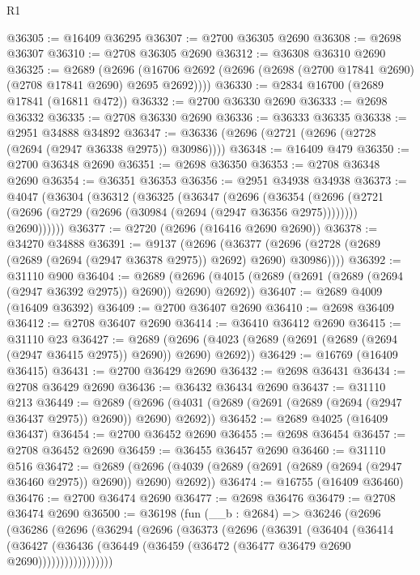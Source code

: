 \begin{lexlean}{R1}
\begin{coremodule}
@36305 := @16409 @36295
@36307 := @2700 @36305 @2690
@36308 := @2698 @36307
@36310 := @2708 @36305 @2690
@36312 := @36308 @36310 @2690
@36325 := @2689
    (@2696 (@16706 @2692 (@2696 (@2698 (@2700 @17841 @2690) (@2708 @17841 @2690) @2695 @2692))))
@36330 := @2834 @16700 (@2689 @17841 (@16811 @472))
@36332 := @2700 @36330 @2690
@36333 := @2698 @36332
@36335 := @2708 @36330 @2690
@36336 := @36333 @36335
@36338 := @2951 @34888 @34892
@36347 := @36336 (@2696 (@2721 (@2696 (@2728 (@2694 (@2947 @36338 @2975)) @30986))))
@36348 := @16409 @479
@36350 := @2700 @36348 @2690
@36351 := @2698 @36350
@36353 := @2708 @36348 @2690
@36354 := @36351 @36353
@36356 := @2951 @34938 @34938
@36373 := @4047
    (@36304
      (@36312
        (@36325
          (@36347
            (@2696
              (@36354
                (@2696 (@2721 (@2696 (@2729 (@2696 (@30984 (@2694 (@2947 @36356 @2975))))))))
                @2690))))))
@36377 := @2720 (@2696 (@16416 @2690 @2690))
@36378 := @34270 @34888
@36391 := @9137
    (@2696 (@36377 (@2696 (@2728 (@2689 (@2689 (@2694 (@2947 @36378 @2975)) @2692) @2690) @30986))))
@36392 := @31110 @900
@36404 := @2689
    (@2696 (@4015 (@2689 (@2691 (@2689 (@2694 (@2947 @36392 @2975)) @2690)) @2690) @2692))
@36407 := @2689 @4009 (@16409 @36392)
@36409 := @2700 @36407 @2690
@36410 := @2698 @36409
@36412 := @2708 @36407 @2690
@36414 := @36410 @36412 @2690
@36415 := @31110 @23
@36427 := @2689
    (@2696 (@4023 (@2689 (@2691 (@2689 (@2694 (@2947 @36415 @2975)) @2690)) @2690) @2692))
@36429 := @16769 (@16409 @36415)
@36431 := @2700 @36429 @2690
@36432 := @2698 @36431
@36434 := @2708 @36429 @2690
@36436 := @36432 @36434 @2690
@36437 := @31110 @213
@36449 := @2689
    (@2696 (@4031 (@2689 (@2691 (@2689 (@2694 (@2947 @36437 @2975)) @2690)) @2690) @2692))
@36452 := @2689 @4025 (@16409 @36437)
@36454 := @2700 @36452 @2690
@36455 := @2698 @36454
@36457 := @2708 @36452 @2690
@36459 := @36455 @36457 @2690
@36460 := @31110 @516
@36472 := @2689
    (@2696 (@4039 (@2689 (@2691 (@2689 (@2694 (@2947 @36460 @2975)) @2690)) @2690) @2692))
@36474 := @16755 (@16409 @36460)
@36476 := @2700 @36474 @2690
@36477 := @2698 @36476
@36479 := @2708 @36474 @2690
@36500 := @36198
    (fun (__b : @2684) =>
    @36246
      (@2696
        (@36286
          (@2696
            (@36294
              (@2696
                (@36373
                  (@2696
                    (@36391
                      (@36404
                        (@36414
                          (@36427
                            (@36436
                              (@36449 (@36459 (@36472 (@36477 @36479 @2690 @2690)))))))))))))))))

\end{coremodule}
\end{lexlean}
